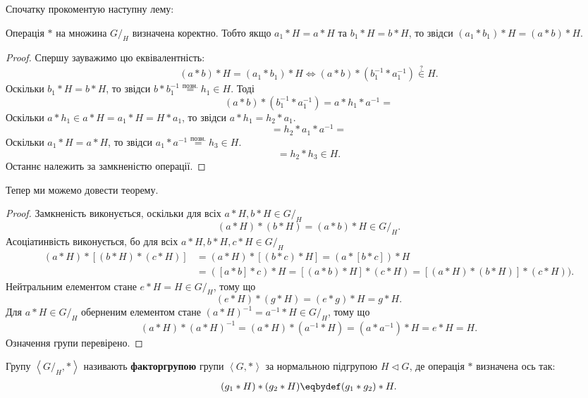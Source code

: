 \documentclass{math_library}
\begin{document}
Спочатку прокоментую наступну лему:
\begin{lemma}
Операція $*$ на множина $G/_H$ визначена коректно. Тобто якщо $a_1*H = a*H$ та $b_1*H = b*H$, то звідси $(a_1*b_1)*H = (a*b)*H$.
\end{lemma}

\begin{proof}
Спершу зауважимо цю еквівалентність:
\[
(a*b)*H = (a_1*b_1)*H \iff (a*b)*(b_1^{-1}*a_1^{-1}) \overset{?}{\in} H.
\]
Оскільки $b_1*H = b*H$, то звідси $b*b_1^{-1} \overset{\text{позн.}}{=} h_1 \in H$. Тоді 
\[
(a*b)*(b_1^{-1}*a_1^{-1}) = a*h_1*a^{-1} \boxed{=}
\]
Оскільки $a*h_1 \in a*H = a_1*H = H*a_1$, то звідси $a*h_1=h_2*a_1$.
\[
\boxed{=} h_2*a_1*a^{-1} \boxed{=}
\]
Оскільки $a_1*H = a*H$, то звідси $a_1*a^{-1} \overset{\text{позн.}}{=} h_3 \in H$.
\[
\boxed{=} h_2*h_3 \in H.
\] 
Останнє належить за замкненістю операції.
\end{proof}

Тепер ми можемо довести теорему.

\begin{proof}
Замкненість виконується, оскільки для всіх $a*H, b*H \in G/_H$
\[ 
(a*H)*(b*H) = (a*b)*H \in G/_H.
\]
Асоціатинвість виконується, бо для всіх $a*H,b*H,c*H \in G/_H$
\begin{align*}
(a*H)*[(b*H)*(c*H)] & = (a*H)*[(b*c)*H] = (a*[b*c])*H \\ & = ([a*b]*c)*H = [(a*b)*H]*(c*H) = [(a*H)*(b*H)]*(c*H)).
\end{align*}
Нейтральним елементом стане $e*H = H \in G/_H$, тому що 
\[
(e*H)*(g*H) = (e*g)*H = g*H.
\]
Для $a*H \in G/_H$ оберненим елементом стане $(a*H)^{-1} = a^{-1}*H \in G/_H$, тому що \[
(a*H)*(a*H)^{-1} = (a*H)*(a^{-1}*H) = (a*a^{-1})*H = e*H = H.
\]
Означення групи перевірено.
\end{proof}

\begin{definition}
Групу $\left<G/_H,* \right>$ називають \textbf{факторгрупою} групи $\left<G,* \right>$ за нормальною підгрупою $H \triangleleft G$, де операція $*$ визначена ось так:
\begin{align*}
(g_1*H) * (g_2*H) \eqbydef (g_1*g_2)*H.
\end{align*}
\end{definition}
\end{document}
